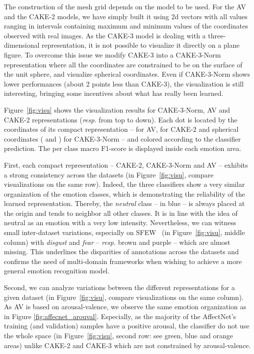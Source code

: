 \documentclass{bmvc2k}
\begin{document}
The construction of the mesh grid depends on the model to be used. 
For the AV and the CAKE-2 models, we have simply built it using 2d vectors with all values ranging in intervals containing maximum and minimum values of the coordinates observed with real images. As the CAKE-3 model is dealing with a three-dimensional representation, it is not possible to visualize it directly on a plane figure.
To overcome this issue we modify CAKE-3 into a CAKE-3-Norm representation where all the coordinates are constrained to be on the surface of the unit sphere, and visualize spherical coordinates. 
Even if CAKE-3-Norm shows lower performances (about 2 points less than CAKE-3), the visualization is still interesting, bringing some incentives about what has really been learned.

Figure~\ref{fig:visu} shows the visualization results  for CAKE-3-Norm, AV and CAKE-2 representations (\textit{resp.} from top to down).
Each dot is located by the coordinates of its compact representation --  for AV,  for CAKE-2 and spherical coordinates ( and ) for CAKE-3-Norm -- and colored according to the classifier prediction. The per class macro F1-score is displayed inside each emotion area.

First, each compact representation -- CAKE-2, CAKE-3-Norm and AV -- exhibits a strong consistency across the datasets (in Figure~\ref{fig:visu}, compare visualizations on the same row). Indeed, the three classifiers show a very similar organization of the emotion classes, which is demonstrating the reliability of the learned representation. Thereby, the \textit{neutral} class -- in blue -- is always placed at the origin and tends to neighbor all other classes. It is in line with the idea of neutral as an emotion with a very low intensity. Nevertheless, we can witness small inter-dataset variations, especially on SFEW~\cite{dhall_static_2011} (in Figure~\ref{fig:visu}, middle column) with \textit{disgust} and \textit{fear} -- \textit{resp.} brown and purple -- which are almost missing. This underlines the disparities of annotations across the datasets and confirms the need of multi-domain frameworks when wishing to achieve a more general emotion recognition model.

Second, we can analyze variations between the different representations for a given dataset (in Figure~\ref{fig:visu}, compare visualizations on the same column). As AV is based on arousal-valence, we observe the same emotion organization as in Figure \ref{fig:affecnet_arouval}. Especially, as the majority of the AffectNet's training (and validation) samples have a positive arousal, the classifier do not use the whole space (in Figure~\ref{fig:visu}, second row: see green, blue and orange areas) unlike CAKE-2 and CAKE-3 which are not constrained by arousal-valence. 
\end{document}
